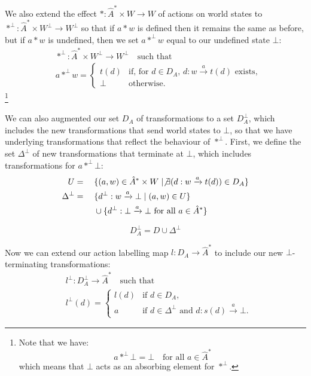 We also extend the effect $\ast : \hat{A}^{\ast} \times W \to W$ of actions on world states to $\ast^{\bot} : \hat{A}^{\ast} \times W^{\bot} \to  W^{\bot}$ so that if $a \ast w$ is defined then it remains the same as before, but if $a \ast w$ is undefined, then we set $a \ast^{\bot} w$ equal to our undefined state $\bot$:
\begin{align}
     & \ast^{\bot} : \hat{A}^{\ast} \times W^{\bot} \to  W^{\bot} \quad\text{such that} \\
     & a \ast^{\bot} w =
    \begin{cases}
        t(d) & \text{if, for $d \in D_{A}$, } d : w \xrightarrow{a} t(d) \text{ exists}, \\
        \bot & \text{otherwise.}
    \end{cases}
\end{align}
\footnote{
    Note that we have:
    \begin{equation}
        a \ast^{\bot} \bot = \bot \quad \text{for all $a \in \hat{A}^{\ast}$}
    \end{equation}
    which means that $\bot$ acts as an absorbing element for $\ast^{\bot}$.
}

We can also augmented our set $D_{A}$ of transformations to a set $D_{A}^{\bot}$, which includes the new transformations that send world states to $\bot$, so that we have underlying transformations that reflect the behaviour of $\ast^{\bot}$.
First, we define the set $\Delta^{\bot}$ of new transformations that terminate at $\bot$, which includes transformations for $a \ast^{\bot} \bot$:
\begin{alignat}{2}
    U             & {}={} &  & \{ (a,w) \in \hat{A}^{\ast} \times W \mid \not\exists (d: w \xrightarrow{a} t(d)) \in D_{A} \} \\
    \Delta^{\bot} & {}={} &  & \{ d^{\bot}: w \xrightarrow{a} \bot \mid (a, w) \in U \}                                       \\
                  &       &  & \cup \{ d^{\bot}: \bot \xrightarrow{a} \bot \text{ for all $a \in \hat{A}^{\ast}$} \}
\end{alignat}

\begin{equation}
    D_{A}^{\bot} = D \cup \Delta^{\bot}
\end{equation}

Now we can extend our action labelling map $l: D_{A} \to \hat{A}^{\ast}$ to include our new $\bot$-terminating transformations:
\begin{align}
     & l^{\bot} : D_{A}^{\bot} \to \hat{A}^{\ast} \quad\text{such that} \\
     & l^{\bot}(d) =
    \begin{cases}
        l(d) & \text{if $d \in D_{A}$},                                            \\
        a    & \text{if $d \in \Delta^{\bot}$ and $d: s(d) \xrightarrow{a} \bot$.}
    \end{cases}
\end{align}

